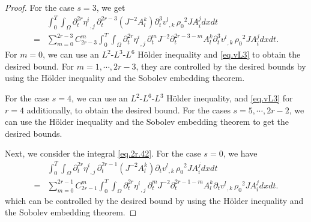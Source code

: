\documentclass[12pt,twoside,reqno]{amsart}
\numberwithin{equation}{section}
\theoremstyle{definition}
\theoremstyle{remark}
\begin{document}
\begin{proof}
For the case $s=3$, we get
\begin{align*}
  &{\int_0^T\!\!\!\!\int_\Omega }{\partial}_t^{2r}{{{\eta^i}}_{,{j}}\,}{\partial}_t^{2r-3} (J^{-2}A_l^k){\partial}_t^3 {{{v^l}}_{,{k}}\,}{\rho_0}^2  J A^j_i dxdt\\
  =&\sum_{m=0}^{2r-3}C_{2r-3}^m{\int_0^T\!\!\!\!\int_\Omega }{\partial}_t^{2r}{{{\eta^i}}_{,{j}}\,} {\partial}_t^m J^{-2}{\partial}_t^{2r-3-m} A_l^k{\partial}_t^3 {{{v^l}}_{,{k}}\,}{\rho_0}^2  J A^j_i dxdt.
\end{align*}
For $m=0$, we can use an $L^2$-$L^3$-$L^6$ H\"older inequality and \eqref{eq.vL3} to obtain the desired bound. For $m=1,\cdots, 2r-3$, they are controlled by the desired bounds by using the H\"older inequality and the Sobolev embedding theorem.

For the case $s=4$, we can use an $L^2$-$L^6$-$L^3$ H\"older inequality, and \eqref{eq.vL3} for $r=4$ additionally, to obtain the desired bound. For the cases $s=5,\cdots, 2r-2$, we can use the H\"older inequality and the Sobolev embedding theorem to get the desired bounds.

Next, we consider the integral \eqref{eq.2r.42}. For the case $s=0$, we have
\begin{align*}
  &{\int_0^T\!\!\!\!\int_\Omega }{\partial}_t^{2r}{{{\eta^i}}_{,{j}}\,}{\partial}_t^{2r-1} (J^{-2}A_l^k){\partial}_t {{{v^l}}_{,{k}}\,}{\rho_0}^2  J A^j_i dxdt\\
  =&\sum_{m=0}^{2r-1}C_{2r-1}^m{\int_0^T\!\!\!\!\int_\Omega }{\partial}_t^{2r}{{{\eta^i}}_{,{j}}\,} {\partial}_t^mJ^{-2}{\partial}_t^{2r-1-m} A_l^k{\partial}_t {{{v^l}}_{,{k}}\,}{\rho_0}^2  J A^j_i dxdt.
\end{align*}
which can be controlled by the desired bound by using the H\"older inequality and the Sobolev embedding theorem.


\end{proof}
\end{document}
